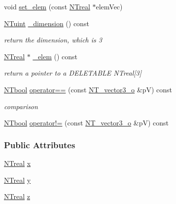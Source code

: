\begin{DoxyCompactItemize}
void \hyperlink{class_n_t__vector3__o_a512467aa43b7a328d633c54829dd0f4c}{set\_\-elem} (const \hyperlink{nt__types_8h_a814a97893e9deb1eedcc7604529ba80d}{NTreal} $\ast$elemVec)
\item 
\hyperlink{nt__types_8h_ac503559f358539d91155f135ee7a365d}{NTuint} \hyperlink{class_n_t__vector3__o_a0f7781953f9238b51bf05cd4448dfec1}{\_\-dimension} () const 
\begin{DoxyCompactList}\small\item\em return the dimension, which is 3 \item\end{DoxyCompactList}\item 
\hyperlink{nt__types_8h_a814a97893e9deb1eedcc7604529ba80d}{NTreal} $\ast$ \hyperlink{class_n_t__vector3__o_a705540fd233a01bade98d81380abb4b2}{\_\-elem} () const 
\begin{DoxyCompactList}\small\item\em return a pointer to a DELETABLE NTreal\mbox{[}3\mbox{]} \item\end{DoxyCompactList}\item 
\hyperlink{nt__types_8h_a9f3200824a52174bb5be77bed3838822}{NTbool} \hyperlink{class_n_t__vector3__o_af1230980116d726bb29ee3c0056e2a8a}{operator==} (const \hyperlink{class_n_t__vector3__o}{NT\_\-vector3\_\-o} \&pV) const 
\begin{DoxyCompactList}\small\item\em comparison \item\end{DoxyCompactList}\item 
\hyperlink{nt__types_8h_a9f3200824a52174bb5be77bed3838822}{NTbool} \hyperlink{class_n_t__vector3__o_a22105f5f51f1473129c2c2b54058c893}{operator!=} (const \hyperlink{class_n_t__vector3__o}{NT\_\-vector3\_\-o} \&pV) const 
\end{DoxyCompactItemize}
\subsubsection*{Public Attributes}
\begin{DoxyCompactItemize}
\item 
\hyperlink{nt__types_8h_a814a97893e9deb1eedcc7604529ba80d}{NTreal} \hyperlink{class_n_t__vector3__o_a592063cf5274ad24e3961bfebc6cff50}{x}
\item 
\hyperlink{nt__types_8h_a814a97893e9deb1eedcc7604529ba80d}{NTreal} \hyperlink{class_n_t__vector3__o_a8036171214f89de95702eaf19763efbd}{y}
\item 
\hyperlink{nt__types_8h_a814a97893e9deb1eedcc7604529ba80d}{NTreal} \hyperlink{class_n_t__vector3__o_a724c03f574c53d886dfac71710bf0a59}{z}
\end{DoxyCompactItemize}
